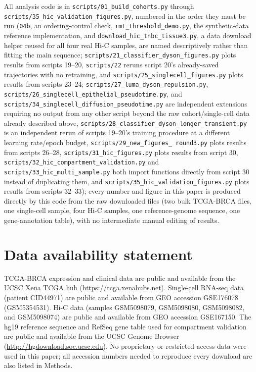 \documentclass[11pt]{article}
\begin{document}
All analysis code is in \texttt{scripts/01\_build\_cohorts.py} through
\texttt{scripts/35\_hic\_validation\_figures.py}, numbered in the order
they must be run (\texttt{04b}, an ordering-control check,
\texttt{rmt\_threshold\_demo.py}, the synthetic-data reference
implementation, and \texttt{download\_hic\_tnbc\_tissue3.py}, a data
download helper reused for all four real Hi-C samples, are named
descriptively rather than fitting the main sequence;
\texttt{scripts/21\_classifier\_dyson\_figures.py} plots
results from scripts 19--20, \texttt{scripts/22} reruns script 20's
already-saved trajectories with no retraining, and
\texttt{scripts/25\_singlecell\_figures.py} plots results from scripts
23--24; \texttt{scripts/27\_luma\_dyson\_repulsion.py},
\texttt{scripts/26\_singlecell\_epithelial\_pseudotime.py}, and
\texttt{scripts/34\_singlecell\_diffusion\_pseudotime.py} are
independent extensions requiring no output from any other script beyond
the raw cohort/single-cell data already described above,
\texttt{scripts/28\_classifier\_dyson\_longer\_transient.py} is an
independent rerun of scripts 19--20's training procedure at a different
learning rate/epoch budget, \texttt{scripts/29\_new\_figures\_
round3.py} plots results from scripts 26--28,
\texttt{scripts/31\_hic\_figures.py} plots results from script 30,
\texttt{scripts/32\_hic\_compartment\_validation.py} and
\texttt{scripts/33\_hic\_multi\_sample.py} both import functions
directly from script 30 instead of duplicating them, and
\texttt{scripts/35\_hic\_validation\_figures.py} plots results from
scripts 32--33); every number and figure in this paper is produced
directly by this code from the raw downloaded files (two bulk TCGA-BRCA
files, one single-cell sample, four Hi-C samples, one reference-genome
sequence, one gene-annotation table), with no intermediate manual
editing of results.

\section*{Data availability statement}
TCGA-BRCA expression and clinical data are public and available from
the UCSC Xena TCGA hub (\url{https://tcga.xenahubs.net}). Single-cell
RNA-seq data (patient CID44971) are public and available from GEO
accession GSE176078 (GSM5354531). Hi-C data (samples GSM5098079,
GSM5098080, GSM5098082, and GSM5098074) are public and available from
GEO accession GSE167150. The hg19 reference sequence and RefSeq gene
table used for compartment validation are public and available from
the UCSC Genome Browser (\url{http://hgdownload.soe.ucsc.edu}). No
proprietary or restricted-access data were used in this paper; all
accession numbers needed to reproduce every download are also listed
in Methods.
\end{document}
